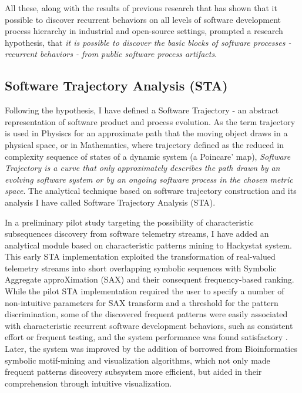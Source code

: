 All these, along with the results of previous research that has shown that it possible to discover 
recurrent behaviors on all levels of software development process hierarchy \cite{citeulike:8347315} 
in industrial \cite{citeulike:5090131} and open-source \cite{citeulike:10377345} settings, 
prompted a research hypothesis, that \textit{it is possible to discover the basic blocks of software 
processes - recurrent behaviors - from public software process artifacts}. 

\subsection{Software Trajectory Analysis (STA)}
Following the hypothesis, I have defined a Software Trajectory - an abstract representation of software
product and process evolution. As the term trajectory is used in Physiscs for an approximate path that the 
moving object draws in a physical space, or in Mathematics, where trajectory defined as the reduced in 
complexity sequence of states of a dynamic system (a Poincare' map), \textit{Software Trajectory is a curve
that only approximately describes the path drawn by an evolving software system or by an ongoing software 
process in the chosen metric space}. The analytical technique based on software trajectory construction
and its analysis I have called Software Trajectory Analysis (STA).

In a preliminary pilot study targeting the possibility of characteristic subsequences discovery from 
software telemetry streams, I have added an analytical module based on characteristic patterns mining 
to Hackystat system. This early STA implementation exploited the transformation of real-valued telemetry 
streams into short overlapping symbolic sequences with Symbolic Aggregate approXimation (SAX) \cite{sax} 
and their consequent frequency-based ranking. 
While the pilot STA implementation required the user to specify a number of non-intuitive parameters for 
SAX transform and a threshold for the pattern discrimination, some of the discovered frequent patterns 
were easily associated with characteristic recurrent software development behaviors, such as consistent 
effort or frequent testing, and the system performance was found satisfactory \cite{csdl2-10-09}.
Later, the system was improved by the addition of borrowed from Bioinformatics symbolic motif-mining and 
visualization algorithms, which not only made frequent patterns discovery subsystem more efficient, 
but aided in their comprehension through intuitive visualization. 

